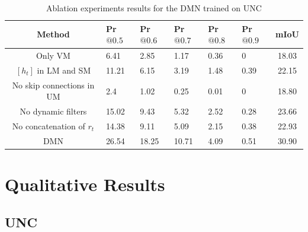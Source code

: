 \begin{table}[!htbp]
    \centering
    \begin{tabular}{ c | p{1.2cm} p{1.2cm} p{1.2cm} p{1.2cm} p{1.2cm} | c }
\hline
Method 								& Pr$@0.5$		& Pr$@0.6$		& Pr$@0.7$		& Pr$@0.8$		& Pr$@0.9$		& mIoU			\\
\hline
Only VM 							& 6.41 			& 2.85 			& 1.17 			& 0.36 			& 0 			& 18.03 		\\
$[h_{t}]$ in LM and SM	& 11.21 		& 6.15 			& 3.19			& 1.48 			& 0.39			& 22.15 		\\
No skip connections in UM 			& 2.4 			& 1.02 			& 0.25 			& 0.01 			& 0 			& 18.80 		\\
No dynamic filters					& 15.02 		& 9.43 			& 5.32 			& 2.52 			& 0.28 			& 23.66 		\\
No concatenation of $r_{t}$			& 14.38 		& 9.11 			& 5.09			& 2.15 			& 0.38			& 22.93 		\\
\hline
DMN							& 26.54 		& 18.25 		& 10.71 		& 4.09 			& 0.51 			& 30.90	 		\\
\hline
\end{tabular}
    \caption{Ablation experiments results for the DMN trained on UNC}
    \label{tab:my_label}
\end{table}

\section{Qualitative Results}
\subsection*{UNC}
